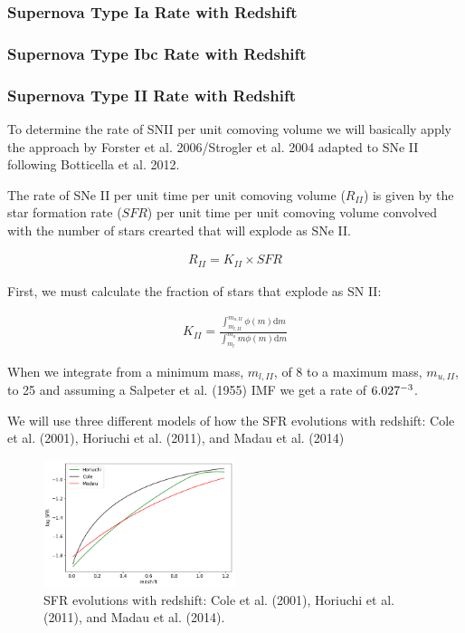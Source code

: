 \documentclass[12pt, onecolumn]{emulateapj}
\begin{document}
\subsubsection{Supernova Type Ia Rate with Redshift}
\label{sec:TypeIaRate}

\subsubsection{Supernova Type Ibc Rate with Redshift}
\label{sec:TypeIbcRate}

\subsubsection{Supernova Type II Rate with Redshift}
\label{sec:TypeIIRate}

To determine the rate of SNII per unit comoving volume we will basically apply the approach by Forster et al. 2006/Strogler et al. 2004 adapted to SNe II following Botticella et al. 2012.

The rate of SNe II per unit time per unit comoving volume ($R_{II}$) is given by the star formation rate ($SFR$) per unit time per unit comoving volume convolved with the number of stars crearted that will explode as SNe II.

\begin{align}
	\label{eq:rateII_1}
	R_{II} = K_{II} \times SFR
\end{align}

First, we must calculate the fraction of stars that explode as SN II:

\begin{align}
\label{eq:rateII_2}
K_{II} = \frac{\int_{m_{l,II}}^{m_{u,II}} \phi(m) \mathrm{d}m}{\int_{m_{l}}^{m_{u}} m\phi(m) \mathrm{d}m}
\end{align}

When we integrate from a minimum mass, $m_{l,II}$, of 8 to a maximum mass, $m_{u,II}$, to 25 and assuming a Salpeter et al. (1955) IMF we get a rate of $6.027 \time 10^{-3}$.

We will use three different models of how the SFR evolutions with redshift: Cole et al. (2001), Horiuchi et al. (2011), and Madau et al. (2014)

\begin{figure}
	\begin{center}
		\includegraphics[width=0.5\textwidth]{fig/SNII_SFR.png}
		\caption{SFR evolutions with redshift: Cole et al. (2001), Horiuchi et al. (2011), and Madau et al. (2014).}
		\label{fig:SNII_SFR}
	\end{center}
\end{figure}
\end{document}

